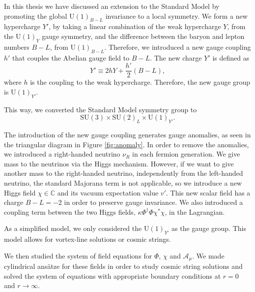In this thesis we have discussed an extension to the Standard Model by promoting the global U$(1)_{B-L}$ invariance to a local symmetry. We form a new hyper\-charge $Y'$, by taking a linear combination of the weak hypercharge $Y$, from the U$(1)_Y$ gauge symmetry, and the  difference between the baryon and lepton numbers $B-L$, from U$(1)_{B-L}$. Therefore, we introduced a new gauge coupling $h'$ that couples the Abelian gauge field to $B-L$.
The new charge $Y'$  is defined as
\begin{equation}
	Y' \equiv 2hY+\frac{h'}{2}(B-L),
\end{equation}
 where $h$ is the coupling to the weak hypercharge. Therefore, the new gauge group is U$(1)_{Y'}$.
 
This way, we converted the Standard Model symmetry group to
 \begin{equation}
	\text{SU}(3)\times \text{SU}(2)_L\times \text{U}(1)_{Y'}.
\end{equation}
 
The introduction of the new gauge coupling generates gauge anomalies, as seen in the triangular diagram in Figure \ref{fig:anomaly}. In order to remove the anomalies, we introduced a right-handed neutrino $\nu_R$ in each fermion genera\-tion. 
We give mass to the neutrinos via the Higgs mechanism. However, if we want to give another mass to the right-handed neutrino, independently from the left-handed neutrino, the standard Majorana term is not applicable, so we introduce a new Higgs field $\chi\in \mathbb{C}$ and its vacuum expectation value $v'$. This new scalar field has a charge $B-L=-2$ in order to preserve gauge invariance. We also introduced a coupling term between the two Higgs fields, $\kappa \Phi^{\dagger}\Phi \chi^{*}\chi$, in the Lagrangian.

As a simplified model, we only considered the U$(1)_{Y'}$ as the gauge group. This model allows for vortex-line solutions or cosmic strings.
 
 We then studied the system of field equations for $\Phi$, $\chi$ and $\mathcal{A}_{\mu}$. We made cylindrical ansätze for these fields in order to study cosmic string solutions and solved the system of equations with appropriate boundary conditions at $r=0$ and $r\to\infty$.

